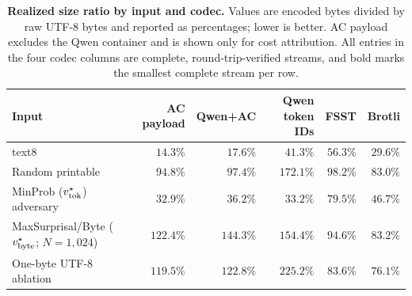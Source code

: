 \begin{table}[t]
\centering
\caption{\textbf{Realized size ratio by input and codec.} Values are encoded bytes divided by raw UTF-8 bytes and reported as percentages; lower is better. AC payload excludes the Qwen container and is shown only for cost attribution. All entries in the four codec columns are complete, round-trip-verified streams, and bold marks the smallest complete stream per row.}
\label{tab:codec-comparison}
\small
\setlength{\tabcolsep}{3.4pt}
\begin{tabular}{lrrrrr}
\toprule
Input & AC payload & Qwen+AC & Qwen token IDs & FSST & Brotli \\
\midrule
text8                    & $14.3\%$ & \textbf{$17.6\%$} & $41.3\%$ & $56.3\%$ & $29.6\%$ \\
Random printable         & $94.8\%$ & $97.4\%$ & $172.1\%$ & $98.2\%$ & \textbf{$83.0\%$} \\
MinProb ($v^\star_{\mathrm{tok}}$) adversary         & $32.9\%$ & $36.2\%$ & \textbf{$33.2\%$} & $79.5\%$ & $46.7\%$ \\
MaxSurprisal/Byte ($v^\star_{\mathrm{byte}}$; $N=1{,}024$) & $122.4\%$ & $144.3\%$ & $154.4\%$ & $94.6\%$ & \textbf{$83.2\%$} \\
One-byte UTF-8 ablation & $119.5\%$ & $122.8\%$ & $225.2\%$ & $83.6\%$ & \textbf{$76.1\%$} \\
\bottomrule
\end{tabular}
\end{table}
